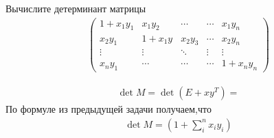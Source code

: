     
\begin{prb}
    Вычислите детерминант матрицы
    \begin{gather*}
        \left(
        \begin{array}{ccccc}
            1 + x_{1} y_{1} &  x_{1} y_{2} & \cdots & \cdots &x_{1} y_{n}\\
           x_{2} y_{1}  &   1 + x_{1} y_{} & x_{2} y_{3} & \cdots & x_{2} y_{n}\\
           \vdots & \vdots & \ddots& \vdots & \vdots\\
           x_{n} y_{1} & \cdots & \cdots & \cdots & 1 + x_{n} y_{n}
        \end{array}
        \right)
    \end{gather*}
\end{prb}

\begin{sol}
    \begin{gather*}
        \det M =  \det (E +  x y^{T}) = 
    \end{gather*}
    По формуле из предыдущей задачи получаем,что
    \begin{gather*}
        \det M = \left(1+ \sum_{i}^{n} x_{i} y_{i}\right)
    \end{gather*}
\end{sol}    
    